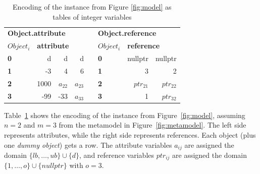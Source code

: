 \begin{table}[!t]
\centering
\begin{tabular}{|lrrr|l|lrr|}
\cline{1-4} \cline{6-8}
\multicolumn{4}{|l|}{\textbf{Object.attribute}}                                                                    &  & \multicolumn{3}{l|}{\textbf{Object.reference}}                                   \\ \cline{1-4} \cline{6-8} 
\multicolumn{1}{|l|}{\textbf{$Object_i$}} & \multicolumn{3}{l|}{\textbf{attribute}}                                     &  & \multicolumn{1}{l|}{\textbf{$Object_i$}} & \multicolumn{2}{l|}{\textbf{reference}}    \\ \cline{1-4} \cline{6-8} 
\multicolumn{1}{|l|}{\textbf{0}}    & \multicolumn{1}{r|}{d}         & \multicolumn{1}{r|}{d}         & d         &  & \multicolumn{1}{l|}{\textbf{0}}    & \multicolumn{1}{r|}{nullptr}         & nullptr         \\ \cline{1-4} \cline{6-8} 
\multicolumn{1}{|l|}{\textbf{1}}    & \multicolumn{1}{r|}{-3}        & \multicolumn{1}{r|}{4}         & 6         &  & \multicolumn{1}{l|}{\textbf{1}}    & \multicolumn{1}{r|}{3}         & 2         \\ \cline{1-4} \cline{6-8} 
\multicolumn{1}{|l|}{\textbf{2}}    & \multicolumn{1}{r|}{1000}      & \multicolumn{1}{r|}{$a_{22}$} & $a_{23}$ &  & \multicolumn{1}{l|}{\textbf{2}}    & \multicolumn{1}{r|}{$ptr_{21}$} & $ptr_{22}$ \\ \cline{1-4} \cline{6-8} 
\multicolumn{1}{|l|}{\textbf{3}}    & \multicolumn{1}{r|}{-99}       & \multicolumn{1}{r|}{-33}       & $a_{33}$ &  & \multicolumn{1}{l|}{\textbf{3}}    & \multicolumn{1}{r|}{1}         & $ptr_{32}$ \\ \cline{1-4} \cline{6-8} 
\end{tabular} 
    \caption{Encoding of the instance from Figure \ref{fig:model} as tables of integer variables}
    \label{tab:encoding}
\end{table}
Table~\ref{tab:encoding} shows the encoding of the instance from Figure~\ref{fig:model}, assuming $n=2$ and $m=3$ from the metamodel in Figure~\ref{fig:metamodel}. The left side represents attributes, while the right side represents references. Each object (plus one \emph{dummy object}) gets a row. The attribute variables $a_{ij}$ are assigned the domain $\{lb, \ldots, ub\} \cup \{d\}$, and reference variables $ptr_{ij}$ are assigned the domain $\{1, \ldots, o\} \cup \{nullptr\}$ with $o=3$.

